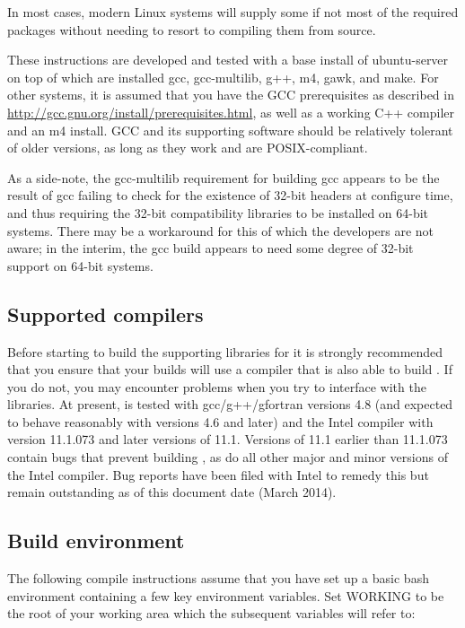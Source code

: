 In most cases, modern Linux systems will supply some if not most of the
required packages without needing to resort to compiling them from source.

These instructions are developed and tested with a base install of
ubuntu-server on top of which are installed gcc, gcc-multilib, g++, m4, gawk,
and make. For other systems, it is assumed that you have the GCC prerequisites
as described in \url{http://gcc.gnu.org/install/prerequisites.html}, as well as
a working C++ compiler and an m4 install. GCC and its supporting software
should be relatively tolerant of older versions, as long as they work and are
POSIX-compliant.

As a side-note, the gcc-multilib requirement for building gcc appears to be
the result of gcc failing to check for the existence of 32-bit headers at
configure time, and thus requiring the 32-bit compatibility libraries to be
installed on 64-bit systems. There may be a workaround for this of which the
\fluidity developers are not aware; in the interim, the gcc build appears to
need some degree of 32-bit support on 64-bit systems.

\subsection{Supported compilers}
\label{sec:required_libraries_supported_compilers}

Before starting to build the supporting libraries for \fluidity it is strongly
recommended that you ensure that your builds will use a compiler that is also
able to build \fluidity. If you do not, you may encounter problems when you try
to interface \fluidity with the libraries. At present, \fluidity is tested with
gcc/g++/gfortran versions 4.8 (and expected to behave reasonably with versions
4.6 and later) and the Intel compiler with version 11.1.073 and later versions
of 11.1. Versions of 11.1 earlier than 11.1.073 contain bugs that prevent
building \fluidity, as do all other major and minor versions of the Intel
compiler. Bug reports have been filed with Intel to remedy this but remain
outstanding as of this document date (March 2014).

\subsection{Build environment}
\label{sec:required_libraries_build_environment}

The following compile instructions assume that you have set up a basic bash
environment containing a few key environment variables. Set WORKING to be the
root of your working area which the subsequent variables will refer to:

